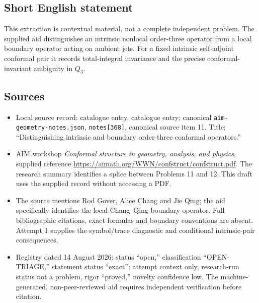 \documentclass[11pt]{article}
\begin{document}
\subsection{Short English statement}
This extraction is contextual material, not a complete independent problem. The supplied aid distinguishes an intrinsic nonlocal order-three operator from a local boundary operator acting on ambient jets. For a fixed intrinsic self-adjoint conformal pair it records total-integral invariance and the precise conformal-invariant ambiguity in \(Q_3\).
\subsection{Sources}
\begin{itemize}
\item Local source record: catalogue entry, catalogue entry; canonical \texttt{aim-geometry-notes.json}, \texttt{notes[368]}, canonical source item 11. Title: ``Distinguishing intrinsic and boundary order-three conformal operators.''
\item AIM workshop \emph{Conformal structure in geometry, analysis, and physics}, supplied reference \url{https://aimath.org/WWN/confstruct/confstruct.pdf}. The research summary identifies a splice between Problems 11 and 12. This draft uses the supplied record without accessing a PDF.
\item The source mentions Rod Gover, Alice Chang and Jie Qing; the aid specifically identifies the local Chang--Qing boundary operator. Full bibliographic citations, exact formulas and boundary conventions are absent. Attempt 1 supplies the symbol/trace diagnostic and conditional intrinsic-pair consequences.
\item Registry dated 14 August 2026: status ``open,'' classification ``OPEN-TRIAGE,'' statement status ``exact''; attempt context only, research-run status not a problem, rigor ``proved,'' novelty confidence low. The machine-generated, non-peer-reviewed aid requires independent verification before citation.
\end{itemize}
\end{document}
